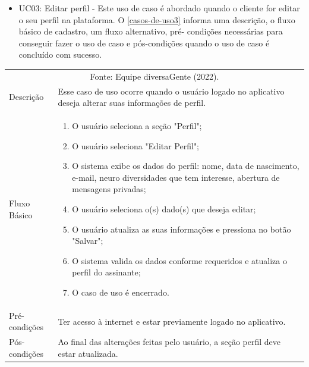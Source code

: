\begin{apendicesenv}
	
	\begin{itemize}
		\item UC03: Editar perfil -  Este uso de caso é abordado quando o cliente for editar o seu perfil na plataforma.
		O \autoref{casos-de-uso3} informa uma descrição, o fluxo básico de cadastro, um fluxo alternativo, pré-
		condições necessárias para conseguir fazer o uso de caso e pós-condições quando o uso de
		caso é concluído com sucesso. \\
		
	\end{itemize}
	
	
	\begin{quadro}[htb]
		\centering
		\ABNTEXfontereduzida
		\caption[Caso de Uso Editar Perfil]{Caso de Uso Editar Perfil}
		\label{casos-de-uso3}
	\end{quadro}	
	\begin{longtable}{|p{3.3cm}|p{12.3cm}|}
		\hline
		\thead{} & \thead{Ator} \\
		\hline
		
		\endfirsthead
		\multicolumn{2}{c}{\scriptsize Fonte: Equipe diversaGente (2022).}%
		{{ \autoref{casos-de-uso3} continued from previous page}} \\
		\endhead
		
		Descrição & Esse caso de uso ocorre quando o usuário logado no aplicativo deseja alterar suas informações de perfil.\\
		\hline
		Fluxo Básico  &
		\begin{enumerate}
			\item O usuário seleciona a seção "Perfil";
			\item O usuário seleciona "Editar Perfil";
			\item O sistema exibe os dados do perfil: nome, data de nascimento, e-mail, neuro diversidades que tem interesse, abertura de mensagens privadas;
			\item O usuário seleciona o(s) dado(s) que deseja editar;
			\item O usuário atualiza as suas informações e pressiona no botão "Salvar";
			\item O sistema valida os dados conforme requeridos e atualiza o perfil do assinante;
			\item O caso de uso é encerrado. 
		\end{enumerate}\\
		\hline
		Pré-condições & Ter acesso à internet e estar previamente logado no aplicativo.\\
		\hline
		Pós-condições & Ao final das alterações feitas pelo usuário, a seção perfil deve estar atualizada.\\
		\hline
	\end{longtable}
	

\end{apendicesenv}
